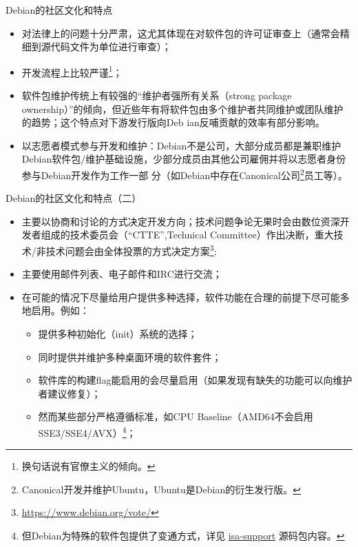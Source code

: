 \begin{frame}{Debian的社区文化和特点}
       \begin{itemize}
               \item 对法律上的问题十分严肃，这尤其体现在对软件包的许可证审查上（通常会精细到源代码文件为单位进行审查）；
               \item 开发流程上比较严谨\footnote{换句话说有官僚主义的倾向。}；
               \item 软件包维护传统上有较强的“维护者强所有关系（strong package ownership）”的倾向，但近些年有将软件包由多个维护者共同维护或团队维护的趋势；这个特点对下游发行版向Deb
ian反哺贡献的效率有部分影响。
               \item 以志愿者模式参与开发和维护：Debian不是公司，大部分成员都是兼职维护Debian软件包/维护基础设施，少部分成员由其他公司雇佣并将以志愿者身份参与Debian开发作为工作一部
分（如Debian中存在Canonical公司\footnote{Canonical开发并维护Ubuntu，Ubuntu是Debian的衍生发行版。}员工等）。
       \end{itemize}
\end{frame}

\begin{frame}{Debian的社区文化和特点（二）}
       \begin{itemize}
               \item 主要以协商和讨论的方式决定开发方向；技术问题争论无果时会由数位资深开发者组成的技术委员会（“CTTE”,Technical Committee）作出决断，重大技术/非技术问题会由全体投票的方式决定方案\footnote{\url{https://www.debian.org/vote/}};
               \item 主要使用邮件列表、电子邮件和IRC进行交流；
               \item 在可能的情况下尽量给用户提供多种选择，软件功能在合理的前提下尽可能多地启用。例如：
               \begin{itemize}
                       \item 提供多种初始化（init）系统的选择；
                       \item 同时提供并维护多种桌面环境的软件套件；
                       \item 软件库的构建flag能启用的会尽量启用（如果发现有缺失的功能可以向维护者建议修复）；
                       \item 然而某些部分严格遵循标准，如CPU Baseline（AMD64不会启用SSE3/SSE4/AVX）\footnote{但Debian为特殊的软件包提供了变通方式，详见 \href{https://tracker.debian
.org/pkg/isa-support}{isa-support} 源码包内容。}；
               \end{itemize}
       \end{itemize}
\end{frame}